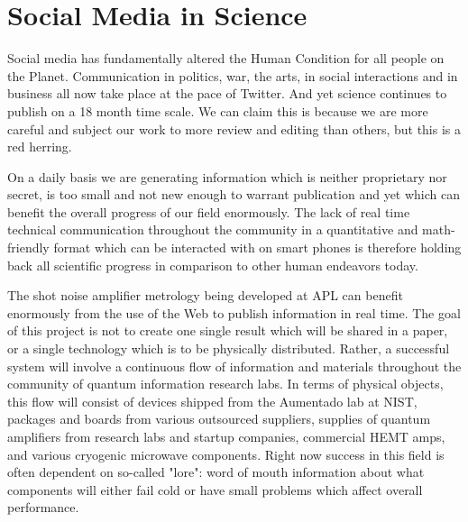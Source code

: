 \documentclass[11pt]{article}
\begin{document}
\section{
Social Media in Science}



    Social media has fundamentally altered the Human Condition for all people on the Planet.  Communication in politics, war, the arts, in social interactions and in business all now take place at the pace of Twitter.  And yet science continues to publish on a 18 month time scale.  We can claim this is because we are more careful and subject our work to more review and editing than others, but this is a red herring.  




    On a daily basis we are generating information which is neither proprietary nor secret, is too small and not new enough to warrant publication and yet which can benefit the overall progress of our field enormously.  The lack of real time technical communication throughout the community in a quantitative and math-friendly format which can be interacted with on smart phones is therefore holding back all scientific progress in comparison to other human endeavors today.  




    The shot noise amplifier metrology being developed at APL can benefit enormously from the use of the Web to publish information in real time.  The goal of this project is not to create one single result which will be shared in a paper, or a single technology which is to be physically distributed.  Rather, a successful system will involve a continuous flow of information and materials throughout the community of quantum information research labs.  In terms of physical objects, this flow will consist of devices shipped from the Aumentado lab at NIST, packages and boards from various outsourced suppliers, supplies of quantum amplifiers from research labs and startup companies, commercial HEMT amps, and various cryogenic microwave components.  Right now success in this field is often dependent on so-called "lore": word of mouth information about what components will either fail cold or have small problems which affect overall performance. 
\end{document}
